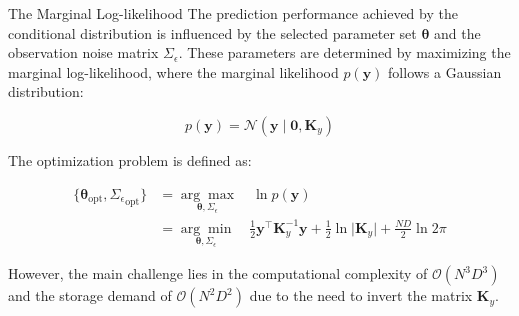\begin{frame}{The Marginal Log-likelihood}
	\justifying
	The prediction performance achieved by the conditional distribution is influenced by the selected parameter set $\bm{\theta}$ and the observation noise matrix $\Sigma_\epsilon$. These parameters are determined by maximizing the marginal log-likelihood, where the marginal likelihood $p(\mathbf{y})$ follows a Gaussian distribution:
	
	\[
	p(\mathbf{y}) = \mathcal{N}(\mathbf{y} \mid \bm{0}, \mathbf{K}_y)
	\]
	
	The optimization problem is defined as:
	
	\begin{equation*}\label{eq:sogp_nlml_opt}
		\begin{aligned}
			\{\bm{\theta}_{\text{opt}}, {\Sigma_\epsilon}_{\text{opt}}\} &= \underset{\bm{\theta}, \Sigma_\epsilon}{\arg\max} \quad \ln p(\mathbf{y}) \\
			&= \underset{\bm{\theta}, \Sigma_\epsilon}{\arg\min} \quad \frac{1}{2} \mathbf{y}^\top \mathbf{K}_y^{-1} \mathbf{y} + \frac{1}{2} \ln \lvert \mathbf{K}_y \rvert + \frac{ND}{2} \ln 2\pi
		\end{aligned}
	\end{equation*}
	
	\vspace{3mm}
	\justifying
	However, the main challenge lies in the computational complexity of $\mathcal{O}(N^3D^3)$ and the storage demand of $\mathcal{O}(N^2D^2)$ due to the need to invert the matrix $\mathbf{K}_y$.
\end{frame}

